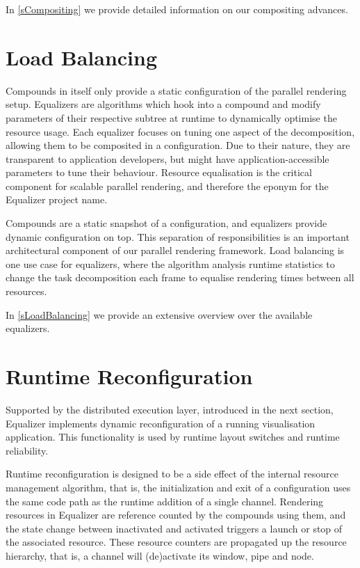 In \cref{sCompositing} we provide detailed information on our compositing advances.

\section{Load Balancing}

Compounds in itself only provide a static configuration of the parallel
rendering setup. \textsf{Equalizers} are algorithms which hook into a compound
and modify parameters of their respective subtree at runtime to dynamically
optimise the resource usage. Each equalizer focuses on tuning one aspect of
the decomposition, allowing them to be composited in a configuration. Due to
their nature, they are transparent to application developers, but might have
application-accessible parameters to tune their behaviour. Resource equalisation
is the critical component for scalable parallel rendering, and therefore the
eponym for the \textsf{Equalizer} project name.

Compounds are a static snapshot of a configuration, and equalizers provide
dynamic configuration on top. This separation of responsibilities is an
important architectural component of our parallel rendering framework. Load
balancing is one use case for equalizers, where the algorithm analysis runtime
statistics to change the task decomposition each frame to equalise rendering
times between all resources.

In \cref{sLoadBalancing} we provide an extensive overview over the available
equalizers.

\section{Runtime Reconfiguration}

Supported by the distributed execution layer, introduced in the next section,
Equalizer implements dynamic reconfiguration of a running visualisation
application. This functionality is used by runtime layout switches and runtime
reliability.

Runtime reconfiguration is designed to be a side effect of the internal resource
management algorithm, that is, the initialization and exit of a configuration
uses the same code path as the runtime addition of a single channel. Rendering
resources in Equalizer are reference counted by the compounds using them, and the
state change between inactivated and activated triggers a launch or stop of the
associated resource. These resource counters are propagated up the resource
hierarchy, that is, a channel will (de)activate its window, pipe and node.

